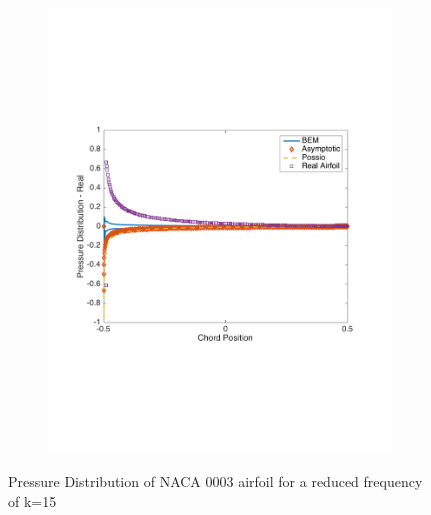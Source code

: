 \documentclass{article}
\begin{document}
\begin{figure}[h]
\begin{subfigure}{0.33\textwidth}
	\includegraphics[width = \textwidth, height=0.16\textheight]{NACA0003_pressure_k15real}
\end{subfigure}%
\caption{Pressure Distribution of NACA 0003 airfoil for a reduced frequency of k=15}
\end{figure}
\end{document}

